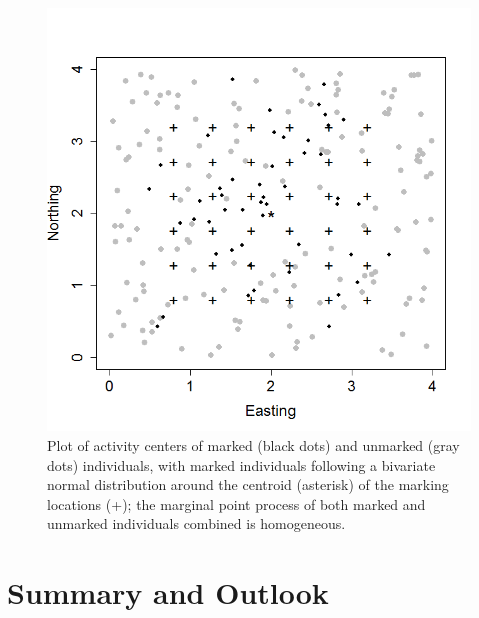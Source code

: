 \begin{figure}[htp]
\begin{center}
\includegraphics[width=5in]{Ch19-PartialID/figs/scrPIDhn.png}
\end{center}
\caption{
Plot of activity centers of marked (black dots) and unmarked (gray dots) individuals, with marked individuals following a bivariate normal distribution around the centroid (asterisk) of the marking locations (+); the marginal point process of both marked and unmarked individuals combined is homogeneous.
}
\label{partialID.fig.hn}
\end{figure}




\section{Summary and Outlook}

